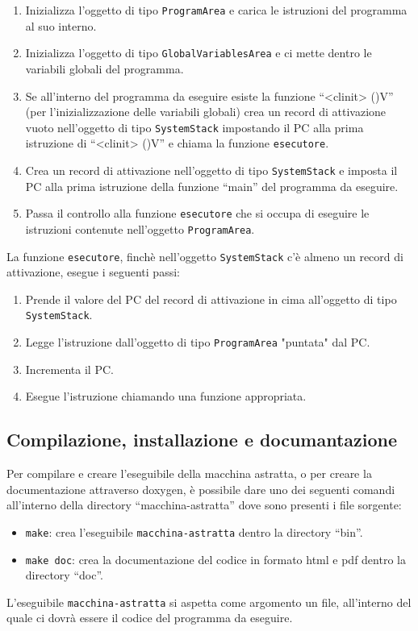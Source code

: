 \begin{enumerate}
  \item Inizializza l'oggetto di tipo \texttt{ProgramArea} e carica le istruzioni del programma al suo interno.
  \item Inizializza l'oggetto di tipo \texttt{GlobalVariablesArea} e ci mette dentro le variabili globali del programma.
  \item Se all'interno del programma da eseguire esiste la funzione ``<clinit> ()V'' (per l'inizializzazione delle variabili globali) crea un record di attivazione vuoto nell'oggetto di tipo \texttt{SystemStack} impostando il PC alla prima istruzione di ``<clinit> ()V'' e chiama la funzione \texttt{esecutore}.
  \item Crea un record di attivazione nell'oggetto di tipo \texttt{SystemStack} e imposta il PC alla prima istruzione della funzione ``main'' del programma da eseguire.
  \item Passa il controllo alla funzione \texttt{esecutore} che si occupa di eseguire le istruzioni contenute nell'oggetto \texttt{ProgramArea}.
\end{enumerate}
La funzione \texttt{esecutore}, finch\`e nell'oggetto \texttt{SystemStack} c'\`e almeno un record di attivazione, esegue i seguenti passi:
\begin{enumerate}
  \item Prende il valore del PC del record di attivazione in cima all'oggetto di tipo \texttt{SystemStack}.
  \item Legge l'istruzione dall'oggetto di tipo \texttt{ProgramArea} "puntata" dal PC.
  \item Incrementa il PC.
  \item Esegue l'istruzione chiamando una funzione appropriata.
\end{enumerate}

\subsection{Compilazione, installazione e documantazione}
Per compilare e creare l'eseguibile della macchina astratta, o per creare la documentazione attraverso doxygen, \`e possibile dare uno dei seguenti comandi all'interno della directory ``macchina-astratta'' dove sono presenti i file sorgente:
\begin{itemize}
  \item \texttt{make}: crea l'eseguibile \texttt{macchina-astratta} dentro la directory ``bin''.
  \item \texttt{make doc}: crea la documentazione del codice in formato html e pdf dentro la directory ``doc''.
\end{itemize}
L'eseguibile \texttt{macchina-astratta} si aspetta come argomento un file, all'interno del quale ci dovr\`a essere il codice del programma da eseguire.
